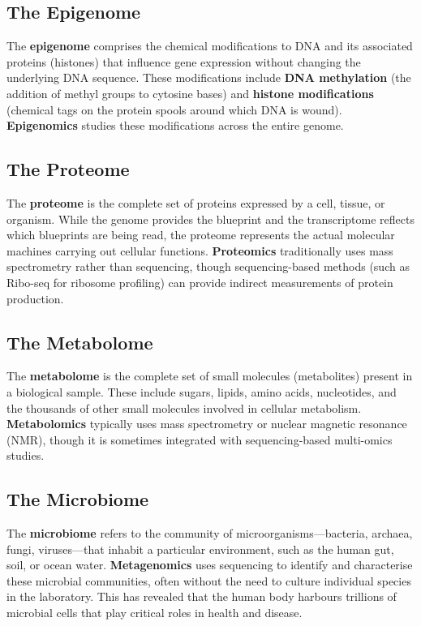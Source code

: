 \subsection{The Epigenome}
\label{subsec:intro:epigenome}

The \textbf{epigenome} comprises the chemical modifications to DNA and its associated proteins (histones) that influence gene expression without changing the underlying DNA sequence. These modifications include \textbf{DNA methylation} (the addition of methyl groups to cytosine bases) and \textbf{histone modifications} (chemical tags on the protein spools around which DNA is wound). \textbf{Epigenomics} studies these modifications across the entire genome.

\subsection{The Proteome}
\label{subsec:intro:proteome}

The \textbf{proteome} is the complete set of proteins expressed by a cell, tissue, or organism. While the genome provides the blueprint and the transcriptome reflects which blueprints are being read, the proteome represents the actual molecular machines carrying out cellular functions. \textbf{Proteomics} traditionally uses mass spectrometry rather than sequencing, though sequencing-based methods (such as Ribo-seq for ribosome profiling) can provide indirect measurements of protein production.

\subsection{The Metabolome}
\label{subsec:intro:metabolome}

The \textbf{metabolome} is the complete set of small molecules (metabolites) present in a biological sample. These include sugars, lipids, amino acids, nucleotides, and the thousands of other small molecules involved in cellular metabolism. \textbf{Metabolomics} typically uses mass spectrometry or nuclear magnetic resonance (NMR), though it is sometimes integrated with sequencing-based multi-omics studies.

\subsection{The Microbiome}
\label{subsec:intro:microbiome}

The \textbf{microbiome} refers to the community of microorganisms---bacteria, archaea, fungi, viruses---that inhabit a particular environment, such as the human gut, soil, or ocean water. \textbf{Metagenomics} uses sequencing to identify and characterise these microbial communities, often without the need to culture individual species in the laboratory. This has revealed that the human body harbours trillions of microbial cells that play critical roles in health and disease.

